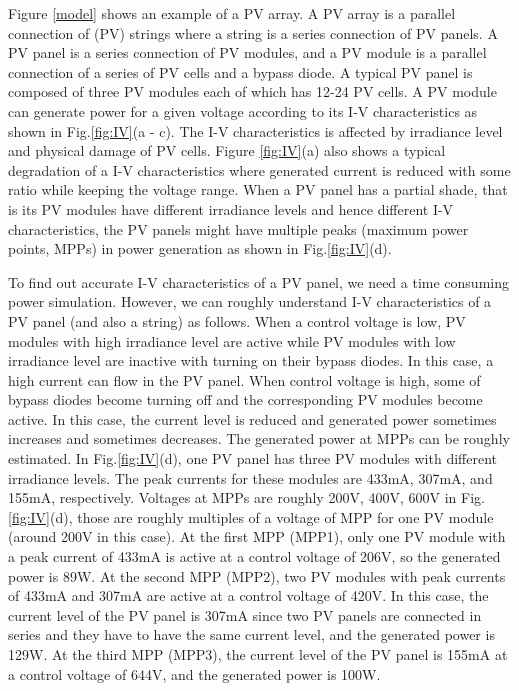 \documentclass[conference]{pvsctran}
\begin{document}
Figure \ref{model} shows an example of a PV array. 
A PV array is a parallel connection of (PV) strings where a string is a series connection of PV panels. 
A PV panel is a series connection of PV modules, and a PV module is a parallel connection of a series of PV cells and a bypass diode. 
A typical PV panel is composed of three PV modules each of which has 12-24 PV cells. 
A PV module can generate power for a given voltage according to its I-V characteristics as shown in Fig.\ref{fig:IV}(a - c). 
The I-V characteristics is affected by irradiance level and physical damage of PV cells. 
Figure \ref{fig:IV}(a) also shows a typical degradation of a I-V characteristics where generated current is reduced with some ratio while keeping the voltage range. 
When a PV panel has a partial shade, that is its PV modules have different irradiance levels and hence different I-V characteristics, the PV panels might have multiple peaks (maximum power points, MPPs) in power generation as shown in Fig.\ref{fig:IV}(d). 

To find out accurate I-V characteristics of a PV panel, we need a time consuming power simulation. 
However, we can roughly understand I-V characteristics of a PV panel (and also a string) as follows. 
When a control voltage is low, PV modules with high irradiance level are active while PV modules with low irradiance level are inactive with turning on their bypass diodes.
In this case, a high current can flow in the PV panel. When control voltage is high, some of bypass diodes become turning off and the corresponding PV modules become active. 
In this case, the current level is reduced and generated power sometimes increases and sometimes decreases. 
The generated power at MPPs can be roughly estimated. 
In Fig.\ref{fig:IV}(d), one PV panel has three PV modules with different irradiance levels. 
The peak currents for these modules are 433mA, 307mA, and 155mA, respectively. 
Voltages at MPPs are roughly 200V, 400V, 600V in Fig.\ref{fig:IV}(d), those are roughly multiples of a voltage of MPP for one PV module (around 200V in this case). 
At the first MPP (MPP1), only one PV module with a peak current of 433mA is active at a control voltage of 206V, so the generated power is 89W. 
At the second MPP (MPP2), two PV modules with peak currents of 433mA and 307mA are active at a control voltage of 420V. 
In this case, the current level of the PV panel is 307mA since two PV panels are connected in series and they have to have the same current level, and the generated power is 129W. At the third MPP (MPP3), the current level of the PV panel is 155mA at a control voltage of 644V, and the generated power is 100W. 
\end{document}
